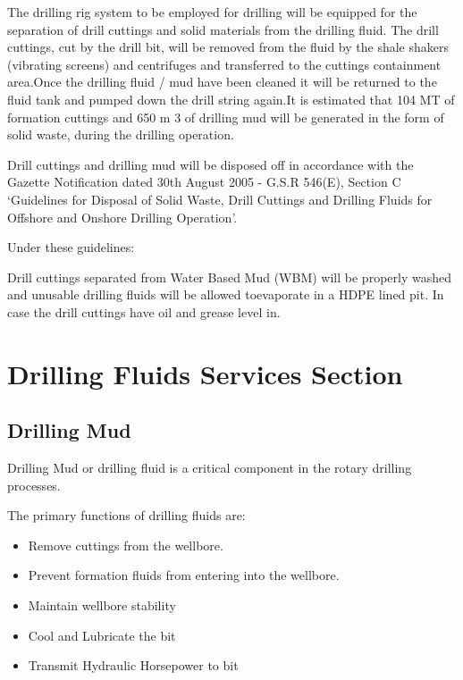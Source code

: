 \documentclass[11pt,a4paper]{article}
\begin{document}
The drilling rig system to be employed for drilling will be equipped for the separation of drill cuttings and solid materials from the drilling fluid. The drill cuttings, cut by the drill bit, will be removed from the fluid by the shale shakers (vibrating screens) and centrifuges and transferred to the cuttings containment area.Once the drilling fluid / mud have been cleaned it will be returned to the fluid tank and pumped down the drill string again.It is estimated that 104 MT of formation cuttings and 650 m 3 of drilling mud will be generated in the form of solid waste, during the drilling operation.

Drill cuttings and drilling mud will be disposed off in accordance with the Gazette Notification dated 30th August 2005 - G.S.R 546(E), Section C ‘Guidelines for Disposal of Solid Waste, Drill Cuttings and Drilling Fluids for Offshore and Onshore Drilling
Operation’. 

Under these guidelines:

Drill cuttings separated from Water Based Mud (WBM) will be properly washed and unusable drilling fluids will be allowed toevaporate in a HDPE lined pit. In case the drill cuttings have oil and grease level in.

\section{\textbf{Drilling Fluids Services Section}}

\subsection{\textbf{Drilling Mud}}
	
Drilling Mud or drilling fluid is a critical component in the rotary drilling processes.

The primary functions of drilling fluids are:

\begin{itemize}

\item Remove cuttings from the wellbore.
\item Prevent formation fluids from entering into the wellbore.
\item Maintain wellbore stability
\item Cool and Lubricate the bit
\item Transmit Hydraulic Horsepower to bit

\end{itemize}
\end{document}
